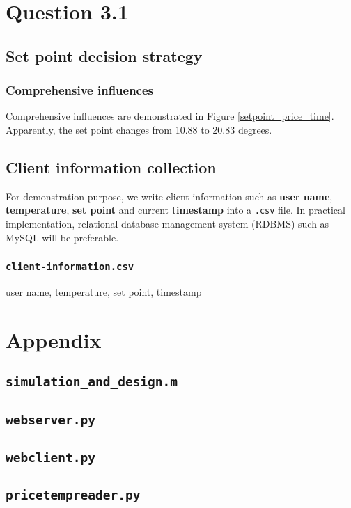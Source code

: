 \documentclass{article}
\newenvironment{homeworkProblem}[1]{
	\section*{#1}
	}{
}
\newenvironment{homeworkSection}[1]{
	\subsection*{#1}
	}{
}
\begin{document}
\begin{homeworkProblem}{Question 3.1}
\begin{homeworkSection}{Set point decision strategy}
\subsubsection*{Comprehensive influences}
Comprehensive influences are demonstrated in Figure \ref{setpoint_price_time}. Apparently, the set point changes from 10.88 to 20.83 degrees.

\end{homeworkSection}


\begin{homeworkSection}{Client information collection}

For demonstration purpose, we write client information such as \textbf{user name}, \textbf{temperature}, \textbf{set point} and current \textbf{timestamp} into a \texttt{.csv} file. In practical implementation, relational database management system (RDBMS) such as MySQL will be preferable.

\subsubsection*{\texttt{client-information.csv}}
user name, temperature, set point, timestamp


\end{homeworkSection}

\end{homeworkProblem}


\newpage
\begin{homeworkProblem}{Appendix}
\subsection*{\texttt{simulation\_and\_design.m}}


\newpage
\subsection*{\texttt{webserver.py}}


\newpage
\subsection*{\texttt{webclient.py}}


\newpage
\subsection*{\texttt{pricetempreader.py}}

\end{homeworkProblem}

\end{document}

